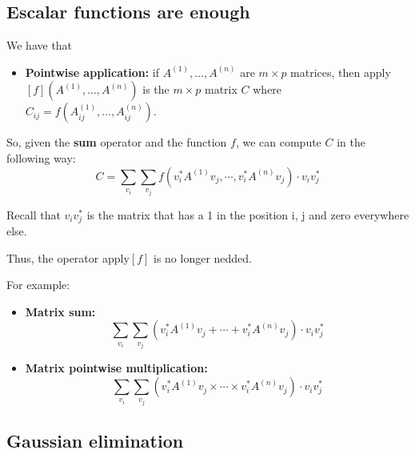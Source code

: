 \subsection*{Escalar functions are enough}

We have that 

\begin{itemize}
	\item \textbf{Pointwise application:} if $A^{(1)}, \ldots, A^{(n)}$ are $m\times p$ matrices, then apply$\left[ f \right](A^{(1)}, \ldots, A^{(n)})$ is the $m\times p$ matrix $C$ where $C_{ij}=f(A^{(1)}_{ij}, \ldots, A^{(n)}_{ij})$.
\end{itemize}

So, given the \textbf{sum} operator and the function $f$, we can compute $C$ in the following way: $$C=\sum_{v_i}\sum_{v_j}f\left( v_i^*A^{(1)}v_j, \cdots, v_i^*A^{(n)}v_j\right)\cdot v_iv_j^*$$

Recall that $v_iv_j^*$ is the matrix that has a 1 in the position i, j and zero everywhere else.

Thus, the operator apply$\left[ f \right]$ is no longer nedded.

For example:

\begin{itemize}
	\item \textbf{Matrix sum:}$$\sum_{v_i}\sum_{v_j}\left( v_i^*A^{(1)}v_j+ \cdots + v_i^*A^{(n)}v_j\right)\cdot v_iv_j^*$$
	\item \textbf{Matrix pointwise multiplication:} $$\sum_{v_i}\sum_{v_j}\left( v_i^*A^{(1)}v_j\times \cdots\times v_i^*A^{(n)}v_j\right)\cdot v_iv_j^*$$
\end{itemize}

\subsection*{Gaussian elimination}



\label{sec:iteration}